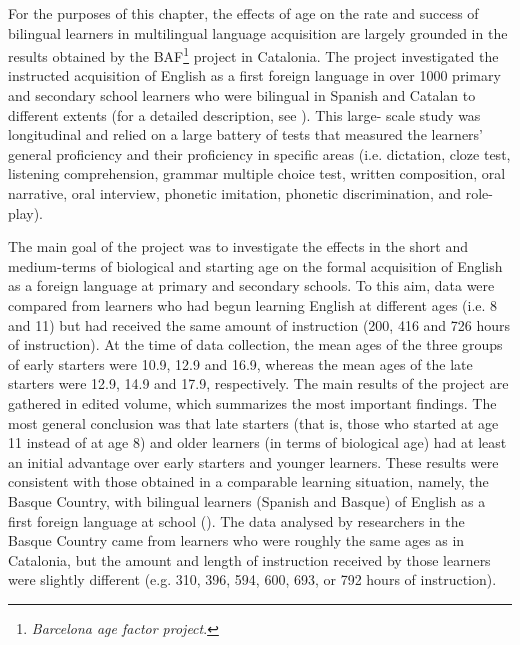 \documentclass[output=paper]{../langscibook}
\begin{document}
For the purposes of this chapter, the effects of age on the rate and success of bilingual learners in multilingual language acquisition are largely grounded in the results obtained by the BAF\footnote{\textit{Barcelona age factor project}.} project in Catalonia. The project investigated the instructed acquisition of English as a first foreign language in over 1000 primary and secondary school learners who were bilingual in Spanish and Catalan to different extents (for a detailed description, see \citealt{Muñoz2000}). This large- scale study was longitudinal and relied on a large battery of tests that measured the learners’ general proficiency and their proficiency in specific areas (i.e. dictation, cloze test, listening comprehension, grammar multiple choice test, written composition, oral narrative, oral interview, phonetic imitation, phonetic discrimination, and role-play).

The main goal of the project was to investigate the effects in the short and medium-terms of biological and starting age on the formal acquisition of English as a foreign language at primary and secondary schools. To this aim, data were compared from learners who had begun learning English at different ages (i.e. 8 and 11) but had received the same amount of instruction (200, 416 and 726 hours of instruction). At the time of data collection, the mean ages of the three groups of early starters were 10.9, 12.9 and 16.9, whereas the mean ages of the late starters were 12.9, 14.9 and 17.9, respectively. The main results of the project are gathered in  edited volume, which summarizes the most important findings. The most general conclusion was that late starters (that is, those who started at age 11 instead of at age 8) and older learners (in terms of biological age) had at least an initial advantage over early starters and younger learners. These results were consistent with those obtained in a comparable learning situation, namely, the Basque Country, with bilingual learners (Spanish and Basque) of English as a first foreign language at school (\citealt{García-MayoGarcía-Lecumberri2003}). The data analysed by researchers in the Basque Country came from learners who were roughly the same ages as in Catalonia, but the amount and length of instruction received by those learners were slightly different (e.g. 310, 396, 594, 600, 693, or 792 hours of instruction).
\end{document}
